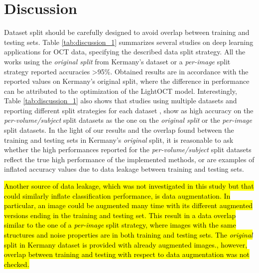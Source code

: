 \documentclass[fleqn,10pt]{wlscirep}
\begin{document}
\section*{Discussion}
Dataset split should be carefully designed to avoid overlap between training and testing sets. Table \ref{tab:discussion_1} summarizes several studies on deep learning applications for OCT data, specifying the described data split strategy. All the works using the \textit{original split} from Kermany’s dataset or a \textit{per-image} split strategy reported accuracies >95\%. Obtained results are in accordance with the reported values on Kermany’s original split, where the difference in performance can be attributed to the optimization of the LightOCT model. Interestingly, Table \ref{tab:discussion_1} also shows that studies using multiple datasets and reporting different split strategies for each dataset \cite{butola2020deep,kamran2019optic, thomas2021novel}, show as high accuracy on the \mbox{\textit{per-volume/subject}} split datasets as the one on the \textit{original split} or the \textit{per-image} split datasets. In the light of our results and the overlap found between the training and testing sets in Kermany’s \textit{original} split, it is reasonable to ask whether the high performances reported for the \textit{per-volume/subject} split datasets reflect the true high performance of the implemented methods, or are examples of inflated accuracy values due to data leakage between training and testing sets. 

\hl{Another source of data leakage, which was not investigated in this study but that could similarly inflate classification performance, is data augmentation.  In particular, an image could be augmented many time with its different augmented versions ending in the training and testing set.  This result in a data overlap similar to the one of a \textit{per-image} split strategy, where images with the same structures and noise properties are in both training and testing sets. The \textit{original} split in Kermany dataset is provided with already augmented images., however, overlap between training and testing with respect to data augmentation was not checked. }
\end{document}
